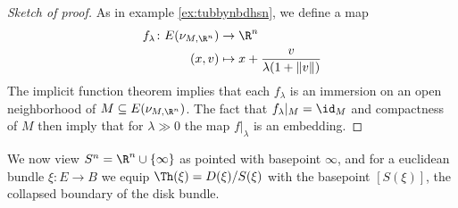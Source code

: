 \begin{proof}[Sketch of proof]
	As in example \ref{ex:tubbynbdhsn}, we define a map
	\begin{align*}
		f_\lambda\colon E(\nu_{M, \R^n}) &\to \R^n \\
		(x, v) &\mapsto x + \frac{v}{\lambda(1 + \lVert v\rVert)}
	\end{align*}
	The implicit function theorem implies that each $f_\lambda$ is an immersion on an open neighborhood of $M \subseteq E(\nu_{M, \R^n})$.
	The fact that $f_\lambda|_M = \id_M$ and compactness of $M$ then imply that for $\lambda \gg 0$ the map $f|_\lambda$ is an embedding.
\end{proof}
We now view $S^n = \R^n \cup \{\infty\}$ as pointed with basepoint $\infty$, and for a euclidean bundle $\xi\colon E \to B$ we equip $\Th(\xi) = D(\xi) / S(\xi)$ with the basepoint $[S(\xi)]$, the collapsed boundary of the disk bundle.

